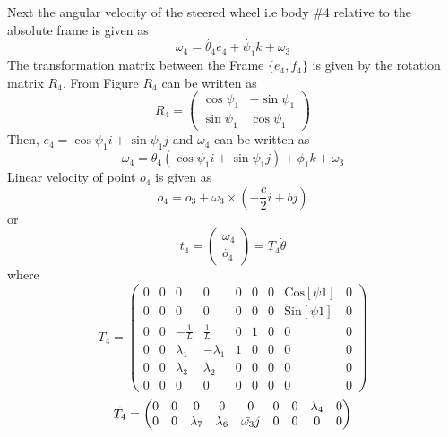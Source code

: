 {Next  the angular velocity of the steered wheel i.e body \#4 relative to the absolute frame is given as 
\[\omega_4=\dot{\theta_4}e_4+ \dot{\psi_1} k +\omega_3\]
The transformation matrix between the Frame $\{e_4,f_4\}$ is given by the rotation matrix $R_4$. From Figure $R_4$ can be written as 
\begin{equation}
\label{eqn:slipR4}
R_4=\begin{pmatrix}
\cos \psi_1 & - \sin \psi_1\\
\sin \psi_1 & \cos\psi_1
\end{pmatrix}
\end{equation}
Then, $e_4= \cos\psi_1 i +\sin \psi_1 j$  and $\omega_4$ can be written as 
\[ \omega_4= \dot{\theta_4}( \cos\psi_1 i +\sin \psi_1 j)+ \dot{\phi_1} k +\omega_3 \]
Linear velocity of point $o_4$ is given as 
\[ \dot{o_4}=\dot{o_3}+\omega_3 \times (-\frac{c}{2}i+bj) \]
or
\begin{equation}
\label{eqn:slip_t4}
t_4=
\begin{pmatrix}
\omega_4\\
\dot{o_4}
\end{pmatrix}=T_4 \dot{\theta}
\end{equation}
where 
\begin{equation}
\label{eqn:slip_T4}
T_4=\left(
\begin{array}{ccccccccc}
0 & 0 & 0 & 0 & 0 & 0 & 0 & \text{Cos}[\text{$\psi $1}] & 0 \\
0 & 0 & 0 & 0 & 0 & 0 & 0 & \text{Sin}[\text{$\psi $1}] & 0 \\
0 & 0 & -\frac{1}{L} & \frac{1}{L} & 0 & 1 & 0 & 0 & 0 \\
0 & 0 & \lambda_1 & -\lambda_1 & 1 & 0 & 0 & 0 & 0 \\
0 & 0 &\lambda_3 & \lambda_2 & 0 & 0 & 0 & 0 & 0 \\
0 & 0 & 0 & 0 & 0 & 0 & 0 & 0 & 0
\end{array}
\right)
\end{equation}
\begin{equation}
\label{eqn{:slip_dT4}}
\dot{T_4}=\begin{pmatrix}
0 & 0 & 0 & 0 & 0 & 0 & 0 & \lambda_4 & 0\\
0 & 0 & \lambda_7 & \lambda_6 & \bar{\omega_3}j & 0 & 0 & 0 & 0
\end{pmatrix}
\end{equation}

}
